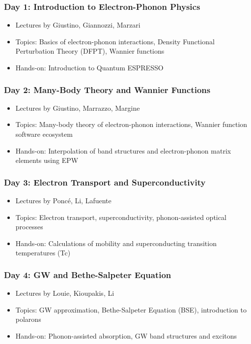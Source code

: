 \documentclass{CustomBeamer}
\begin{document}
\iffalse
\begin{frame}
    \frametitle{Day 1: Introduction to Electron-Phonon Physics}
    \begin{itemize}
        \item Lectures by Giustino, Giannozzi, Marzari
        \item Topics: Basics of electron-phonon interactions, Density Functional Perturbation Theory (DFPT), Wannier functions
        \item Hands-on: Introduction to Quantum ESPRESSO
    \end{itemize}
    \end{frame}
    
    \begin{frame}
    \frametitle{Day 2: Many-Body Theory and Wannier Functions}
    \begin{itemize}
        \item Lectures by Giustino, Marrazzo, Margine
        \item Topics: Many-body theory of electron-phonon interactions, Wannier function software ecosystem
        \item Hands-on: Interpolation of band structures and electron-phonon matrix elements using EPW
    \end{itemize}
    \end{frame}
    
    \begin{frame}
    \frametitle{Day 3: Electron Transport and Superconductivity}
    \begin{itemize}
        \item Lectures by Poncé, Li, Lafuente
        \item Topics: Electron transport, superconductivity, phonon-assisted optical processes
        \item Hands-on: Calculations of mobility and superconducting transition temperatures (Tc)
    \end{itemize}
    \end{frame}
    
    \begin{frame}
    \frametitle{Day 4: GW and Bethe-Salpeter Equation}
    \begin{itemize}
        \item Lectures by Louie, Kioupakis, Li
        \item Topics: GW approximation, Bethe-Salpeter Equation (BSE), introduction to polarons
        \item Hands-on: Phonon-assisted absorption, GW band structures and excitons
    \end{itemize}
    \end{frame}
    
\end{document}
